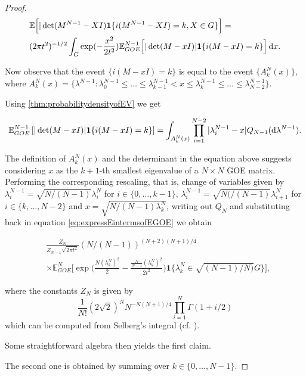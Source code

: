 \begin{proof}
\begin{align}\label{eq:expressEintermsofEGOE}
	&\mathbb E\Big[|\det(M^{N-1}-XI)\mathbf 1\{i(M^{N-1}-XI)=k,X\in G\}\Big]=\nonumber\\
	&(2\pi t^2)^{-1/2}\int_G\exp(-\frac{x^2}{2t^2})\mathbb E_{GOE}^{N-1}\Big[|\det(M-xI)|\mathbf 1\{i(M-xI)=k\}\Big]\mathop{}\!\mathrm{d} x.
\end{align}

Now observe that the event $\{i(M-xI)=k\}$ is equal to the event $\{A_k^N(x)\}$, where $A_k^N(x) = \{\lambda^{N-1}: \lambda_0^{N-1}\leq\dots\leq\lambda_{k-1}^{N-1}<x\leq\lambda_k^{N-1}\leq\dots\leq\lambda_{N-2}^{N-1}\}$.

Using \ref{thm:probabilitydensityofEV} we get

\begin{equation*}
	\mathbb E_{GOE}^{N-1}\left[|\det(M-xI)|\mathbf 1\{i(M-xI)=k\}\right]=\int_{A_k^N(x)}\prod_{i=1}^{N-2}|\lambda_i^{N-1}-x|Q_{N-1}(\mathop{}\!\mathrm{d}\lambda^{N-1}).
\end{equation*}

The definition of $A_k^N(x)$ and the determinant in the equation above suggests considering $x$ as the $k+1$-th smallest eigenvalue of a $N\times N$ GOE matrix. Performing the corresponding rescaling, that is, change of variables given by $\lambda_i^{N-1}=\sqrt{N/(N-1)}\lambda_i^N$ for $i\in\{0,\dots,k-1\}$, $\lambda_i^{N-1}=\sqrt{N(/(N-1)}\lambda_{i+1}^N$ for $i\in\{k,\dots,N-2\}$ and $x=\sqrt{N/(N-1)\lambda_k^N}$, writing out $Q_N$ and substituting back in equation \ref{eq:expressEintermsofEGOE} we obtain

\begin{align*}
	&\frac{Z_N}{Z_{N-1}\sqrt{2\pi t^2}}(N/(N-1))^{(N+2)(N+1)/4}\\
	&\times\mathbb E_{GOE}^N\Big[\exp\Big(\frac{N(\lambda_k^N)^2}{2}-\frac{\frac{N}{N-1}(\lambda_k^N)^2}{2t^2}\Big)\mathbf 1\{\lambda_k^N\in\sqrt{(N-1)/N)}G\}\Big],
\end{align*}

where the constants $Z_N$ is given by $$\frac{1}{N!}(2\sqrt 2)^N N^{-N(N+1)/4}\prod_{i=1}^N \Gamma(1+i/2)$$ which can be computed from Selberg's integral (cf. \cite{Mehta2004random}).

Some straightforward algebra then yields the first claim.

The second one is obtained by summing over $k\in\{0,\dots,N-1\}$.

\end{proof}

